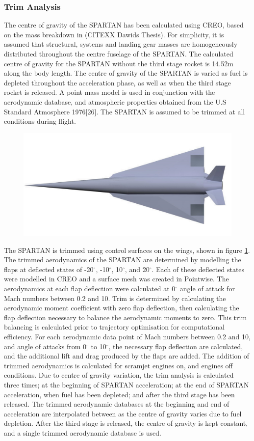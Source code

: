 		\subsubsection{Trim Analysis}
The centre of gravity of the SPARTAN has been calculated using CREO, based on the mass breakdown in (CITEXX Dawids Thesis). For simplicity, it is assumed that structural, systems and landing gear masses are homogeneously distributed throughout the centre fuselage of the SPARTAN. The calculated centre of gravity for the SPARTAN without the third stage rocket is 14.52m along the body length. 
The centre of gravity of the SPARTAN is varied as fuel is depleted throughout the acceleration phase, as well as when the third stage rocket is released. A point mass model is used in conjunction with the aerodynamic database,
and atmospheric properties obtained from the U.S Standard Atmosphere 1976[26]. The SPARTAN is assumed to be
trimmed at all conditions during flight.
\begin{figure}
	\centering
	\includegraphics[width=0.7\linewidth]{figures/3_vehicle_design/SPARTAN_FLAPS}
	\caption{}
	\label{fig:SPARTAN_FLAPS}
\end{figure}
The SPARTAN is trimmed using control surfaces on the wings, shown in figure \ref{fig:SPARTAN_FLAPS}. 
The trimmed aerodynamics of the SPARTAN are determined by modelling the flaps at deflected states of -20$^\circ$, -10$^\circ$, 10$^\circ$, and 20$^\circ$. Each of these deflected states were modelled in CREO and a surface mesh was created in Pointwise. The aerodynamics at each flap deflection were calculated at 0$^\circ$ angle of attack for Mach numbers between 0.2 and 10. Trim is determined by calculating the aerodynamic moment coefficient with zero flap deflection, then calculating the flap deflection necessary to balance the aerodynamic moments to zero. This trim balancing is calculated prior to trajectory optimisation for computational efficiency. For each aerodynamic data point of Mach numbers between 0.2 and 10, and angle of attacks from 0$^\circ$ to 10$^\circ$, the necessary flap deflection are calculated, and the additional lift and drag produced by the flaps are added. The addition of trimmed aerodynamics is calculated for scramjet engines on, and engines off conditions. Due to centre of gravity variation, the trim analysis is calculated three times; at the beginning of SPARTAN acceleration; at the end of SPARTAN acceleration, when fuel has been depleted; and after the third stage has been released. The trimmed aerodynamic databases at the beginning and end of acceleration are interpolated between as the centre of gravity varies due to fuel depletion. After the third stage is released, the centre of gravity is kept constant, and a single trimmed aerodynamic database is used. 

